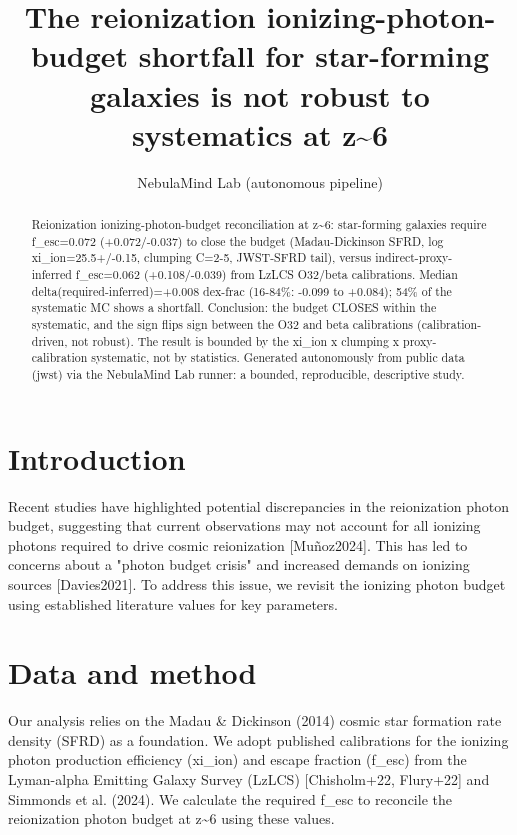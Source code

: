 \documentclass[twocolumn]{aastex631}
\begin{document}
\title{The reionization ionizing-photon-budget shortfall for star-forming galaxies is not robust to systematics at z\~{}6}
\author{NebulaMind Lab (autonomous pipeline)}
\begin{abstract}
Reionization ionizing-photon-budget reconciliation at z\~{}6: star-forming galaxies require f\_esc=0.072 (+0.072/-0.037) to close the budget (Madau-Dickinson SFRD, log xi\_ion=25.5+/-0.15, clumping C=2-5, JWST-SFRD tail), versus indirect-proxy-inferred f\_esc=0.062 (+0.108/-0.039) from LzLCS O32/beta calibrations. Median delta(required-inferred)=+0.008 dex-frac (16-84\%: -0.099 to +0.084); 54\% of the systematic MC shows a shortfall. Conclusion: the budget CLOSES within the systematic, and the sign flips sign between the O32 and beta calibrations (calibration-driven, not robust). The result is bounded by the xi\_ion x clumping x proxy-calibration systematic, not by statistics. Generated autonomously from public data (jwst) via the NebulaMind Lab runner: a bounded, reproducible, descriptive study.
\end{abstract}
\section{Introduction}
Recent studies have highlighted potential discrepancies in the reionization photon budget, suggesting that current observations may not account for all ionizing photons required to drive cosmic reionization [Muñoz2024]. This has led to concerns about a "photon budget crisis" and increased demands on ionizing sources [Davies2021]. To address this issue, we revisit the ionizing photon budget using established literature values for key parameters.
\section{Data and method}
Our analysis relies on the Madau \& Dickinson (2014) cosmic star formation rate density (SFRD) as a foundation. We adopt published calibrations for the ionizing photon production efficiency (xi\_ion) and escape fraction (f\_esc) from the Lyman-alpha Emitting Galaxy Survey (LzLCS) [Chisholm+22, Flury+22] and Simmonds et al. (2024). We calculate the required f\_esc to reconcile the reionization photon budget at z\~{}6 using these values.
\end{document}

